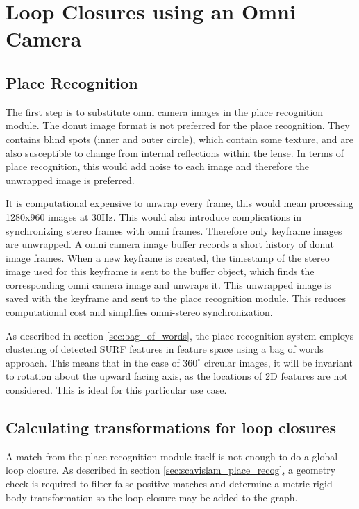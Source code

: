 \chapter{Loop Closures using an Omni Camera}
\label{chapter:omni_loop_close}

\section{Place Recognition}

The first step is to substitute omni camera images in the place recognition module. The donut image format is not preferred for the place recognition.  They contains blind spots (inner and outer circle), which contain some texture, and are also susceptible to change from internal reflections within the lense.  In terms of place recognition, this would add noise to each image and therefore the unwrapped image is preferred.

It is computational expensive to unwrap every frame, this would mean processing 1280x960 images at 30Hz.  This would also introduce complications in synchronizing stereo frames with omni frames.  Therefore only keyframe images are unwrapped.  A omni camera image buffer records a short history of donut image frames.  When a new keyframe is created, the timestamp of the stereo image used for this keyframe is sent to the buffer object, which finds the corresponding omni camera image and unwraps it.  This unwrapped image is saved with the keyframe and sent to the place recognition module.  This reduces computational cost and simplifies omni-stereo synchronization.

As described in section \ref{sec:bag_of_words}, the place recognition system employs clustering of detected SURF features in feature space using a bag of words approach.  This means that in the case of $360^\circ$ circular images, it will be invariant to rotation about the upward facing axis, as the locations of 2D features are not considered.  This is ideal for this particular use case.

\section{Calculating transformations for loop closures}
\label{sec:calc_loop_edge}

A match from the place recognition module itself is not enough to do a global loop closure.  As described in section \ref{sec:scavislam_place_recog}, a geometry check is required to filter false positive matches and determine a metric rigid body transformation so the loop closure may be added to the graph.

